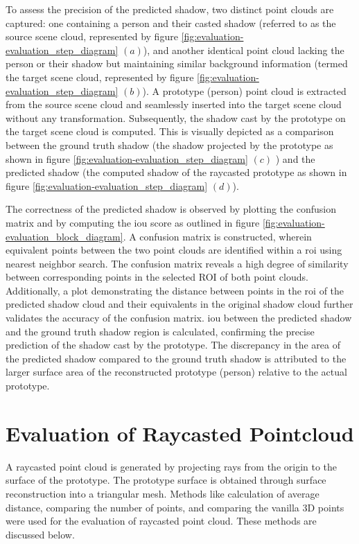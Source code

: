 To assess the precision of the predicted shadow, two distinct point clouds are captured: one containing a person and their casted shadow (referred to as the source scene cloud, represented by figure \ref{fig:evaluation-evaluation_step_diagram} \((a)\)), and another identical point cloud lacking the person or their shadow but maintaining similar background information (termed the target scene cloud, represented by figure \ref{fig:evaluation-evaluation_step_diagram} \((b)\)). A prototype (person) point cloud is extracted from the source scene cloud and seamlessly inserted into the target scene cloud without any transformation. Subsequently, the shadow cast by the prototype on the target scene cloud is computed. This is visually depicted as a comparison between the ground truth shadow (the shadow projected by the prototype as shown in figure \ref{fig:evaluation-evaluation_step_diagram} \((c)\) ) and the predicted shadow (the computed shadow of the raycasted prototype as shown in figure \ref{fig:evaluation-evaluation_step_diagram} \((d)\)).

The correctness of the predicted shadow is observed by plotting the confusion matrix and by computing the \acrshort{iou} score as outlined in figure \ref{fig:evaluation-evaluation_block_diagram}. A confusion matrix is constructed, wherein equivalent points between the two point clouds are identified within a \acrfull{roi} using nearest neighbor search. The confusion matrix reveals a high degree of similarity between corresponding points in the selected ROI of both point clouds. Additionally, a plot demonstrating the distance between points in the \acrshort{roi} of the predicted shadow cloud and their equivalents in the original shadow cloud further validates the accuracy of the confusion matrix. \acrfull{iou} between the predicted shadow and the ground truth shadow region is calculated, confirming the precise prediction of the shadow cast by the prototype. The discrepancy in the area of the predicted shadow compared to the ground truth shadow is attributed to the larger surface area of the reconstructed prototype (person) relative to the actual prototype.



\section{Evaluation of Raycasted Pointcloud}
A raycasted point cloud is generated by projecting rays from the origin to the surface of the prototype. The prototype surface is obtained through surface reconstruction into a triangular mesh. Methods like calculation of average distance, comparing the number of points, and comparing the vanilla 3D points were used for the evaluation of raycasted point cloud. These methods are discussed below.
